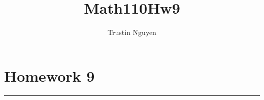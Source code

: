 \documentclass{article}
\title{Math110Hw9}
\author{Trustin Nguyen}
\begin{document}
\maketitle

\section*{Homework 9}
\hrule
\end{document}
